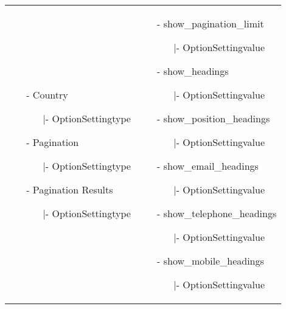 \begin{minipage}{0.7\textwidth}
\begin{tabular}{|p{} | p{}|}
\begin{itemize}
\begin{enumerate}
		   		\end{enumerate} 
		\item[-] Country
			\begin{enumerate}
		   			\item[|-] OptionSettingtype
		   		\end{enumerate} 
		\item[-] Pagination
			\begin{enumerate}
		   			\item[|-] OptionSettingtype
		   		\end{enumerate} 
		\item[-] Pagination Results
			\begin{enumerate}
		   			\item[|-] OptionSettingtype
		   		\end{enumerate}
	\end{itemize}
 & 
\begin{itemize}
		\item[-] show\_pagination\_limit
		\begin{enumerate}
	   			\item[|-] OptionSettingvalue
	   		\end{enumerate}  
		\item[-] show\_headings
		\begin{enumerate}
		   			\item[|-] OptionSettingvalue
		   		\end{enumerate} 
		\item[-] show\_position\_headings
		\begin{enumerate}
		   			\item[|-] OptionSettingvalue
		   		\end{enumerate} 
		\item[-] show\_email\_headings
			\begin{enumerate}
			   			\item[|-] OptionSettingvalue
			   		\end{enumerate} 
		\item[-] show\_telephone\_headings
			\begin{enumerate}
			   			\item[|-] OptionSettingvalue
			   		\end{enumerate} 
		\item[-] show\_mobile\_headings
			\begin{enumerate}
			   			\item[|-] OptionSettingvalue
			   		\end{enumerate} 

\end{itemize}
\end{tabular}
\end{minipage}
